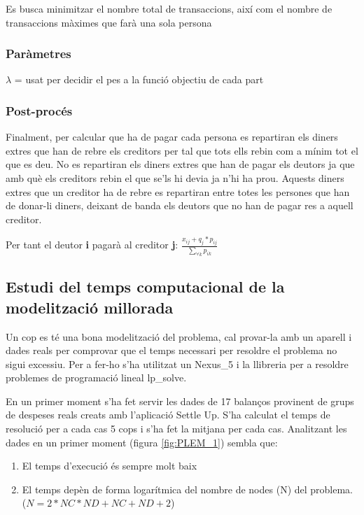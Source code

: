 Es busca minimitzar el nombre total de transaccions, així com el nombre de transaccions màximes que farà una sola persona
\subsubsection{Paràmetres}
$\lambda$ = usat per decidir el pes a la funció objectiu de cada part

\subsubsection{Post-procés}
Finalment, per calcular que ha de pagar cada persona es repartiran els diners extres que han de rebre els creditors per tal que tots ells rebin com a mínim tot el que es deu. No es repartiran els diners extres que han de pagar els deutors ja que amb què els creditors rebin el que se'ls hi devia ja n'hi ha prou. Aquests diners extres que un creditor ha de rebre es repartiran entre totes les persones que han de donar-li diners, deixant de banda els deutors que no han de pagar res a aquell creditor. 

Per tant el deutor \textbf{i} pagarà al creditor \textbf{j}: $\frac{x_{ij} + q_{j}*p_{ij}}{\sum\limits_{\forall k} p_{ik}}$

\subsection{Estudi del temps computacional de la modelització millorada}
Un cop es té una bona modelització del problema, cal provar-la amb un aparell i dades reals per comprovar que el temps necessari per resoldre el problema no sigui excessiu. Per a fer-ho s'ha utilitzat un \gls{Nexus_5} i la llibreria per a resoldre problemes de programació lineal \gls{lp_solve}.

En un primer moment s'ha fet servir les dades de 17 balanços provinent de grups de despeses reals creats amb l'aplicació Settle Up. S'ha calculat el temps de resolució per a cada cas 5 cops i s'ha fet la mitjana per cada cas. Analitzant les dades en un primer moment (figura \ref{fig:PLEM_1}) sembla que:

\begin{enumerate}
\item El temps d'execució és sempre molt baix
\item El temps depèn de forma logarítmica del nombre de nodes (N) del problema. ($N = 2*NC*ND + NC + ND + 2$)
\end{enumerate}


